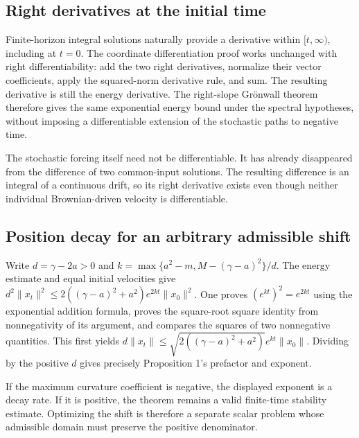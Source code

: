 \documentclass[11pt,a4paper]{report}
\begin{document}
\subsection{\texorpdfstring{Right derivatives at the initial time}{Right derivatives at the initial time}}
\label{report-step-KineticLangevin-Contraction-lean-7}


Finite-horizon integral solutions naturally provide a derivative within \([t,\infty)\), including at \(t=0\). The coordinate differentiation proof works unchanged with right differentiability: add the two right derivatives, normalize their vector coefficients, apply the squared-norm derivative rule, and sum. The resulting derivative is still the energy derivative. The right-slope Grönwall theorem therefore gives the same exponential energy bound under the spectral hypotheses, without imposing a differentiable extension of the stochastic paths to negative time.



The stochastic forcing itself need not be differentiable. It has already disappeared from the difference of two common-input solutions. The resulting difference is an integral of a continuous drift, so its right derivative exists even though neither individual Brownian-driven velocity is differentiable.

\subsection{\texorpdfstring{Position decay for an arbitrary admissible shift}{Position decay for an arbitrary admissible shift}}
\label{report-step-KineticLangevin-Contraction-lean-8}


Write \(d=\gamma-2a>0\) and \(k=\max\{a^2-m,M-(\gamma-a)^2\}/d\). The energy estimate and equal initial velocities give \(d^2\|x_t\|^2\le2((\gamma-a)^2+a^2)e^{2kt}\|x_0\|^2\). One proves \((e^{kt})^2=e^{2kt}\) using the exponential addition formula, proves the square-root square identity from nonnegativity of its argument, and compares the squares of two nonnegative quantities. This first yields \(d\|x_t\|\le\sqrt{2((\gamma-a)^2+a^2)}e^{kt}\|x_0\|\). Dividing by the positive \(d\) gives precisely Proposition 1's prefactor and exponent.



If the maximum curvature coefficient is negative, the displayed exponent is a decay rate. If it is positive, the theorem remains a valid finite-time stability estimate. Optimizing the shift is therefore a separate scalar problem whose admissible domain must preserve the positive denominator.
\end{document}
